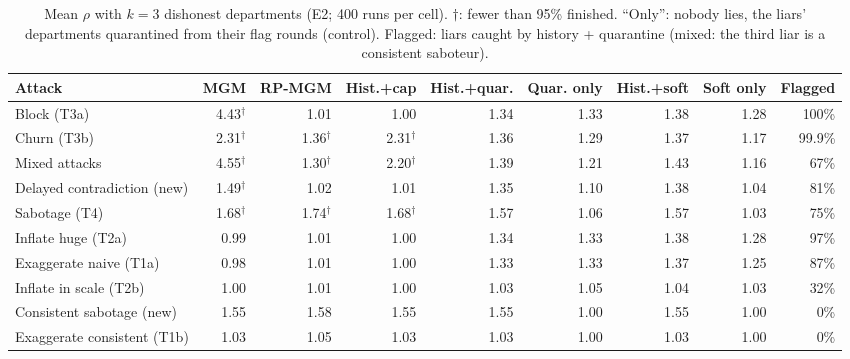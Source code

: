 \begin{table}[t]
\centering
\footnotesize
\setlength{\tabcolsep}{4pt}
\caption{Mean $\rho$ with $k=3$ dishonest departments (E2; 400 runs per cell). $\dagger$: fewer than 95\% finished. ``Only'': nobody lies, the liars' departments quarantined from their flag rounds (control). Flagged: liars caught by history + quarantine (mixed: the third liar is a consistent saboteur).}
\label{tab:e2}
\begin{tabular}{lrrrrrrrr}
\toprule
Attack & MGM & RP-MGM & Hist.+cap & Hist.+quar. & Quar. only & Hist.+soft & Soft only & Flagged \\
\midrule
Block (T3a) & 4.43$^\dagger$ & 1.01 & 1.00 & 1.34 & 1.33 & 1.38 & 1.28 & 100\% \\
Churn (T3b) & 2.31$^\dagger$ & 1.36$^\dagger$ & 2.31$^\dagger$ & 1.36 & 1.29 & 1.37 & 1.17 & 99.9\% \\
Mixed attacks & 4.55$^\dagger$ & 1.30$^\dagger$ & 2.20$^\dagger$ & 1.39 & 1.21 & 1.43 & 1.16 & 67\% \\
Delayed contradiction (new) & 1.49$^\dagger$ & 1.02 & 1.01 & 1.35 & 1.10 & 1.38 & 1.04 & 81\% \\
Sabotage (T4) & 1.68$^\dagger$ & 1.74$^\dagger$ & 1.68$^\dagger$ & 1.57 & 1.06 & 1.57 & 1.03 & 75\% \\
Inflate huge (T2a) & 0.99 & 1.01 & 1.00 & 1.34 & 1.33 & 1.38 & 1.28 & 97\% \\
Exaggerate naive (T1a) & 0.98 & 1.01 & 1.00 & 1.33 & 1.33 & 1.37 & 1.25 & 87\% \\
Inflate in scale (T2b) & 1.00 & 1.01 & 1.00 & 1.03 & 1.05 & 1.04 & 1.03 & 32\% \\
Consistent sabotage (new) & 1.55 & 1.58 & 1.55 & 1.55 & 1.00 & 1.55 & 1.00 & 0\% \\
Exaggerate consistent (T1b) & 1.03 & 1.05 & 1.03 & 1.03 & 1.00 & 1.03 & 1.00 & 0\% \\
\bottomrule
\end{tabular}
\end{table}
